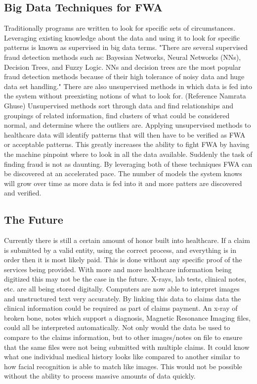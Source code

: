 \documentclass[sigconf]{acmart}
\begin{document}
\subsection{Big Data Techniques for FWA}

Traditionally programs are written to look for specific sets of circumstances.  Leveraging existing knowledge about the data and using it to look for specific patterns is known as supervised in big data terms.  "There are several supervised fraud detection methods such as: Bayesian Networks, Neural Networks (NNs), Decision Trees, and Fuzzy Logic. NNs and decision trees are the most popular fraud detection methods because of their high tolerance of noisy data and huge data set handling."  There are also unsupervised methods in which data is fed into the system without preexisting notions of what to look for.  (Reference Namrata Ghuse)  Unsupervised methods sort through data and find relationships and groupings of related information, find clusters of what could be considered normal, and determine where the outliers are.  Applying unsupervised methods to healthcare data will identify patterns that will then have to be verified as FWA or acceptable patterns.  This greatly increases the ability to fight FWA by having the machine pinpoint where to look in all the data available.  Suddenly the task of finding fraud is not as daunting.  By leveraging both of these techniques FWA can be discovered at an accelerated pace.  The number of models the system knows will grow over time as more data is fed into it and more patters are discovered and verified.

\subsection{The Future}

Currently there is still a certain amount of honor built into healthcare.  If a claim is submitted by a valid entity, using the correct process, and everything is in order then it is most likely paid.  This is done without any specific proof of the services being provided.  With more and more healthcare information being digitized this may not be the case in the future.  X-rays, lab tests, clinical notes, etc. are all being stored digitally.  Computers are now able to interpret images and unstructured text very accurately.  By linking this data to claims data the clinical information could be required as part of claims payment.  An x-ray of broken bone, notes which support a diagnosis, Magnetic Resonance Imaging files, could all be interpreted automatically.  Not only would the data be used to compare to the claims information, but to other images/notes on file to ensure that the same files were not being submitted with multiple claims.  It could know what one individual medical history looks like compared to another similar to how facial recognition is able to match like images.  This would not be possible without the ability to process massive amounts of data quickly.  
\end{document}
